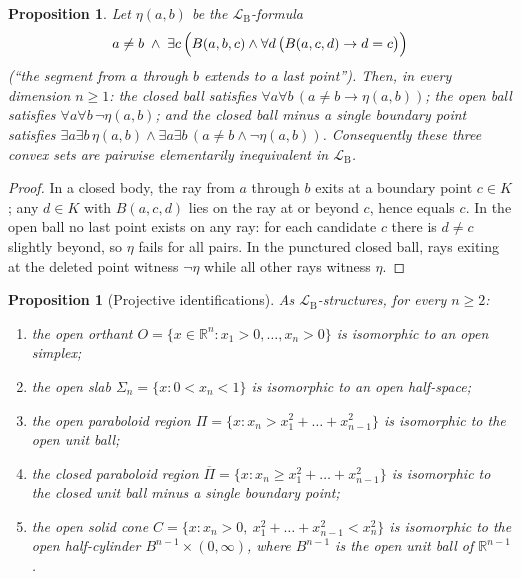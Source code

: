 \documentclass[11pt]{amsart}
\newtheorem{proposition}[theorem]{Proposition}
\theoremstyle{definition}
\newcommand{\R}{\mathbb{R}}
\newcommand{\LB}{\mathcal{L}_{\mathrm{B}}}
\begin{document}
\begin{proposition}\label{prop:openclosed}
Let $\eta(a,b)$ be the $\LB$-formula
\[
a\ne b\;\wedge\;\exists c\,\Bigl(B(a,b,c)\wedge\forall d\,
\bigl(B(a,c,d)\to d=c\bigr)\Bigr)
\]
(``the segment from $a$ through $b$ extends to a last point''). Then, in
every dimension $n\ge1$: the closed ball satisfies
$\forall a\forall b\,(a\ne b\to\eta(a,b))$; the open ball satisfies
$\forall a\forall b\,\neg\eta(a,b)$; and the closed ball minus a single
boundary point satisfies $\exists a\exists b\,\eta(a,b)\wedge
\exists a\exists b\,(a\ne b\wedge\neg\eta(a,b))$. Consequently these three
convex sets are pairwise elementarily inequivalent in $\LB$.
\end{proposition}

\begin{proof}
In a closed body, the ray from $a$ through $b$ exits at a boundary point
$c\in K$; any $d\in K$ with $B(a,c,d)$ lies on the ray at or beyond $c$,
hence equals $c$. In the open ball no last point exists on any ray: for each
candidate $c$ there is $d\ne c$ slightly beyond, so $\eta$ fails for all
pairs. In the punctured closed ball, rays exiting at the deleted point
witness $\neg\eta$ while all other rays witness $\eta$.
\end{proof}

\begin{proposition}[Projective identifications]
\label{prop:projident}
As $\LB$-structures, for every $n\ge2$:
\begin{enumerate}[label=\textup{(\alph*)}]
\item the open orthant $O=\{x\in\R^n:x_1>0,\dots,x_n>0\}$ is isomorphic to
an open simplex;
\item the open slab $\Sigma_n=\{x:0<x_n<1\}$ is isomorphic to an open
half-space;
\item the open paraboloid region $\Pi=\{x:x_n>x_1^2+\dots+x_{n-1}^2\}$ is
isomorphic to the open unit ball;
\item the closed paraboloid region $\overline\Pi=\{x:x_n\ge
x_1^2+\dots+x_{n-1}^2\}$ is isomorphic to the closed unit ball minus a
single boundary point;
\item the open solid cone $C=\{x:x_n>0,\
x_1^2+\dots+x_{n-1}^2<x_n^2\}$ is isomorphic to the open half-cylinder
$B^{n-1}\times(0,\infty)$, where $B^{n-1}$ is the open unit ball of
$\R^{n-1}$.
\end{enumerate}
\end{proposition}
\end{document}
